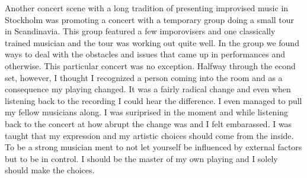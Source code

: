 \documentclass[a4paper]{article}
\begin{document}
Another concert scene with a long tradition of presenting improvised music in Stockholm was promoting a concert with a temporary group doing a small tour in Scandinavia. This group featured a few imporovisers and one classically trained musician and the tour was working out quite well. In the group we found ways to deal with the obstacles and issues that came up in performances and otherwise. This particular concert was no exception. Halfway through the econd set, however, I thought I recognized a person coming into the room and as a consequence my playing changed. It was a fairly radical change and even when listening back to the recording I could hear the difference. I even managed to pull my fellow musicians along. I was suriprised in the moment and while listening back to the concert at how abrupt the change was and I felt embarassed. I was taught that my expression and my artistic choices should come from the inside. To be a strong musician ment to not let yourself be influenced by external factors but to be in control. I should be the master of my own playing and I  solely should make the choices.

\end{document}
